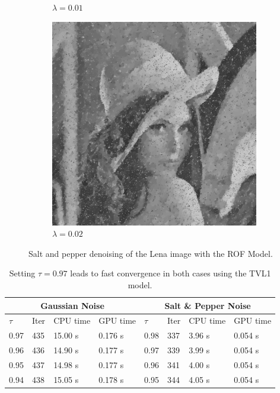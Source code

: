 \documentclass[abstracton]{scrreprt}
\begin{document}
\begin{figure}[!ht]
\begin{subfigure}[b]{0.24\textwidth}
                    \caption{$\lambda = 0.01$}
                \end{subfigure}
                \begin{subfigure}[b]{0.24\textwidth}
                    \includegraphics[width=\textwidth]{img/denoising/salt_and_pepper_noise/002lena.png}
                    \caption{$\lambda = 0.02$}
                \end{subfigure}
                \caption[Salt and pepper denoising example: ROF.]{Salt and pepper denoising of the Lena image with the ROF Model.}
            \label{fig:denoising_lena_rof_sap}
            \end{figure}
            \begin{table}[!ht]
                \centering
                \begin{tabular}{| l | l | l | l | l | l | l | l |}
                    \hline
                    \multicolumn{4}{|c|}{Gaussian Noise} & \multicolumn{4}{|c|}{Salt \& Pepper Noise} \\ \hline\hline
                    $\tau$ & Iter & CPU time & GPU time & $\tau$ & Iter & CPU time & GPU time \\ \hline
                    0.97 & 435 & 15.00 s & 0.176 s & 0.98 & 337 & 3.96 s & 0.054 s \\ \hline
                    0.96 & 436 & 14.90 s & 0.177 s & 0.97 & 339 & 3.99 s & 0.054 s \\ \hline
                    0.95 & 437 & 14.98 s & 0.177 s & 0.96 & 341 & 4.00 s & 0.054 s \\ \hline
                    0.94 & 438 & 15.05 s & 0.178 s & 0.95 & 344 & 4.05 s & 0.054 s \\ \hline
                \end{tabular}
                \caption[Best estimate of $\tau$ for the TVL1 model for denoising.]{Setting $\tau = 0.97$ leads to fast convergence in both cases using the TVL1 model.}
                \label{tab:estimation_of_tau_denoising}
            \end{table}
\end{document}
